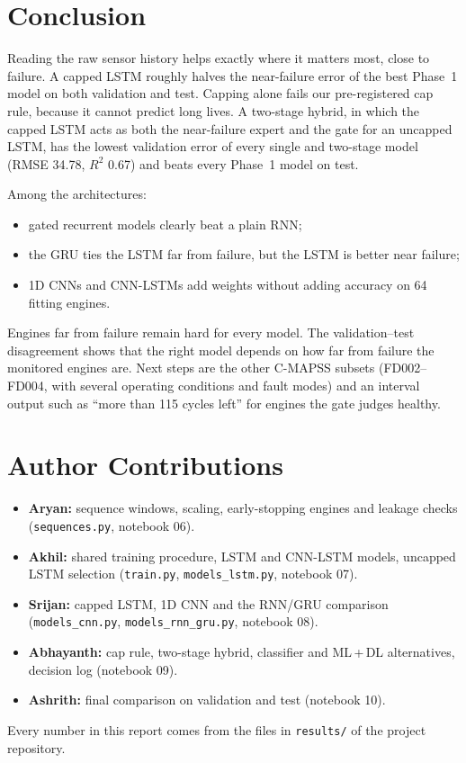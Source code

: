 \documentclass[conference]{IEEEtran}
\begin{document}
\section{Conclusion}
Reading the raw sensor history helps exactly where it matters most, close to failure. A capped LSTM roughly halves the near-failure error of the best Phase~1 model on both validation and test. Capping alone fails our pre-registered cap rule, because it cannot predict long lives. A two-stage hybrid, in which the capped LSTM acts as both the near-failure expert and the gate for an uncapped LSTM, has the lowest validation error of every single and two-stage model (RMSE 34.78, $R^2$ 0.67) and beats every Phase~1 model on test.

Among the architectures:
\begin{itemize}
  \item gated recurrent models clearly beat a plain RNN;
  \item the GRU ties the LSTM far from failure, but the LSTM is better near failure;
  \item 1D CNNs and CNN-LSTMs add weights without adding accuracy on 64 fitting engines.
\end{itemize}

Engines far from failure remain hard for every model. The validation--test disagreement shows that the right model depends on how far from failure the monitored engines are. Next steps are the other C-MAPSS subsets (FD002--FD004, with several operating conditions and fault modes) and an interval output such as ``more than 115 cycles left'' for engines the gate judges healthy.

\section*{Author Contributions}
\begin{itemize}
  \item \textbf{Aryan:} sequence windows, scaling, early-stopping engines and leakage checks (\texttt{sequences.py}, notebook 06).
  \item \textbf{Akhil:} shared training procedure, LSTM and CNN-LSTM models, uncapped LSTM selection (\texttt{train.py}, \texttt{models\_lstm.py}, notebook 07).
  \item \textbf{Srijan:} capped LSTM, 1D CNN and the RNN/GRU comparison (\texttt{models\_cnn.py}, \texttt{models\_rnn\_gru.py}, notebook 08).
  \item \textbf{Abhayanth:} cap rule, two-stage hybrid, classifier and ML\,+\,DL alternatives, decision log (notebook 09).
  \item \textbf{Ashrith:} final comparison on validation and test (notebook 10).
\end{itemize}
Every number in this report comes from the files in \texttt{results/} of the project repository.
\end{document}
